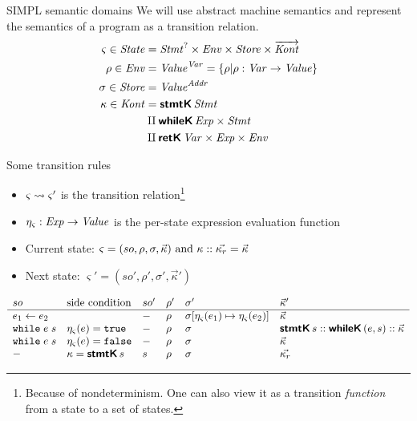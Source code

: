 \documentclass[aspectratio=169,14pt]{beamer}
\begin{document}
\begin{frame}{SIMPL semantic domains}
  \begingroup\footnotesize We will use abstract machine semantics and represent the semantics of a program as a transition relation.\endgroup
\begin{align*}
  \varsigma \in \mathit{State} & = \mathit{Stmt}^? \times \mathit{Env} \times \mathit{Store} \times \overrightarrow{\mathit{Kont}} \\
  \rho \in \mathit{Env} & = \mathit{Value}^{\mathit{Var}} = \left\{ \rho \vert \rho : \mathit{Var} \rightarrow \mathit{Value} \right\} \\
  \sigma \in \mathit{Store} & = \mathit{Value}^{\mathit{Addr}} \\
  \kappa \in \mathit{Kont} & = \textsf{\textbf{stmtK}}\,\mathit{Stmt} \\
                       & \amalg \textsf{\textbf{whileK}}\,\mathit{Exp} \times \mathit{Stmt} \\
                       & \amalg \textsf{\textbf{retK}}\,\mathit{Var} \times \mathit{Exp} \times \mathit{Env}
\end{align*}
\end{frame}
\begin{frame}{Some transition rules}
  \small
  \begin{itemize}
  \item $\varsigma \rightsquigarrow \varsigma'$ is the transition relation\footnote{Because of nondeterminism. One can also view it as a transition \emph{function} from a state to a set of states.}
  \item \(\eta_\varsigma : \mathit{Exp} \to \mathit{Value} \) is the per-state expression evaluation function
\item Current state: \(\varsigma = (so, \rho, \sigma, \vec{\kappa})$ and $\kappa :: \vec{\kappa_r} = \vec{\kappa} \)
\item Next state: \( \varsigma' = (so', \rho', \sigma', \vec{\kappa}') \) \pause
  \end{itemize}
  \footnotesize
  \[
  \begin{array}{llllll}
    so & \text{side condition} & so' & \rho' & \sigma' & \vec{\kappa}' \\ \hline
    e_1 \leftarrow e_2 & & - & \rho & \sigma[\eta_\varsigma(e_1) \mapsto \eta_\varsigma(e_2)] & \vec{\kappa} \\
    \texttt{while}\; e\; s & \eta_\varsigma(e) = \texttt{true} & - & \rho & \sigma & \textsf{\textbf{stmtK}}\,s :: \textsf{\textbf{whileK}}\,(e, s) :: \vec{\kappa} \\
    \texttt{while}\; e\; s & \eta_\varsigma(e) = \texttt{false} & - & \rho & \sigma & \vec{\kappa} \\
    - & \kappa = \textsf{\textbf{stmtK}}\,s & s & \rho & \sigma & \vec{\kappa_r}
  \end{array}
  \]
\end{frame}
\end{document}
